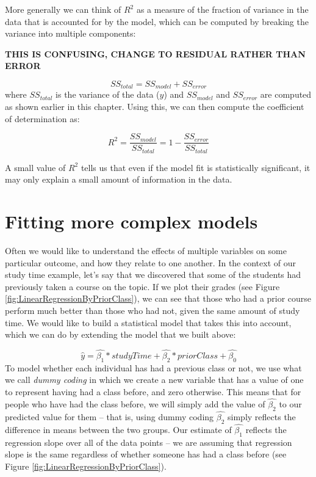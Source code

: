 \documentclass[
  12pt,
]{book}
\begin{document}
More generally we can think of \(R^2\) as a measure of the fraction of variance in the data that is accounted for by the model, which can be computed by breaking the variance into multiple components:

\textbf{THIS IS CONFUSING, CHANGE TO RESIDUAL RATHER THAN ERROR}

\[
SS_{total} = SS_{model} + SS_{error}
\]
where \(SS_{total}\) is the variance of the data (\(y\)) and \(SS_{model}\) and \(SS_{error}\) are computed as shown earlier in this chapter. Using this, we can then compute the coefficient of determination as:

\[
R^2 = \frac{SS_{model}}{SS_{total}} = 1 - \frac{SS_{error}}{SS_{total}}
\]

A small value of \(R^2\) tells us that even if the model fit is statistically significant, it may only explain a small amount of information in the data.

\hypertarget{fitting-more-complex-models}{%
\section{Fitting more complex models}\label{fitting-more-complex-models}}

Often we would like to understand the effects of multiple variables on some particular outcome, and how they relate to one another. In the context of our study time example, let's say that we discovered that some of the students had previously taken a course on the topic. If we plot their grades (see Figure \ref{fig:LinearRegressionByPriorClass}), we can see that those who had a prior course perform much better than those who had not, given the same amount of study time. We would like to build a statistical model that takes this into account, which we can do by extending the model that we built above:

\[
\hat{y} = \hat{\beta_1}*studyTime + \hat{\beta_2}*priorClass + \hat{\beta_0}
\]
To model whether each individual has had a previous class or not, we use what we call \emph{dummy coding} in which we create a new variable that has a value of one to represent having had a class before, and zero otherwise. This means that for people who have had the class before, we will simply add the value of \(\hat{\beta_2}\) to our predicted value for them -- that is, using dummy coding \(\hat{\beta_2}\) simply reflects the difference in means between the two groups. Our estimate of \(\hat{\beta_1}\) reflects the regression slope over all of the data points -- we are assuming that regression slope is the same regardless of whether someone has had a class before (see Figure \ref{fig:LinearRegressionByPriorClass}).
\end{document}

